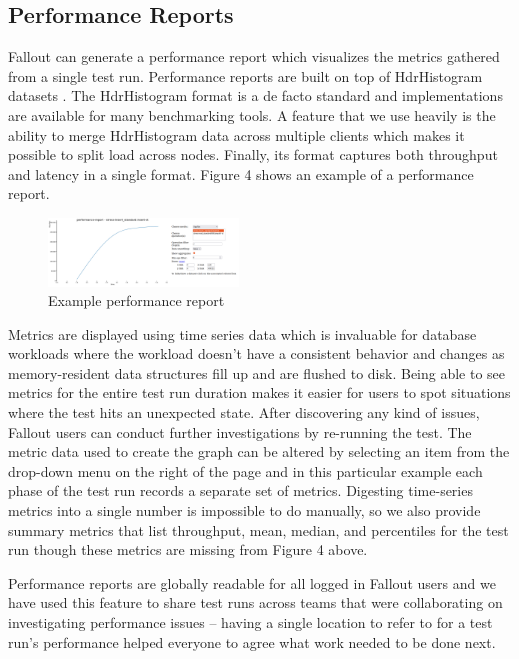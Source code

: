 \documentclass[a4paper,fleqn]{cas-dc}
\begin{document}
\subsection{Performance Reports}

Fallout can generate a performance report which visualizes the metrics gathered from a single test
run. Performance reports are built on top of HdrHistogram datasets \cite{HDRHISTOGRAM}. The HdrHistogram
format is a de facto standard and implementations are available for many benchmarking tools. A
feature that we use heavily is the ability to merge HdrHistogram data across multiple clients which
makes it possible to split load across nodes. Finally, its format captures both throughput and
latency in a single format. Figure 4 shows an example of a performance report.

\begin{figure}
	\includegraphics[width=0.45\textwidth]{perf-report-single}
	\caption{Example performance report}\label{Figure 4}
\end{figure}


Metrics are displayed using time series data which is invaluable for database workloads where the
workload doesn’t have a consistent behavior and changes as memory-resident data structures fill up
and are flushed to disk. Being able to see metrics for the entire test run duration makes it easier
for users to spot situations where the test hits an unexpected state. After discovering any kind of
issues, Fallout users can conduct further investigations by re-running the test. The metric data used
to create the graph can be altered by selecting an item from the drop-down menu on the right of the
page and in this particular example each phase of the test run records a separate set of metrics.
Digesting time-series metrics into a single number is impossible to do manually, so we also provide
summary metrics that list throughput, mean, median, and percentiles for the test run though these
metrics are missing from Figure 4 above.

Performance reports are globally readable for all logged in Fallout users and we have used this
feature to share test runs across teams that were collaborating on investigating performance issues
-- having a single location to refer to for a test run’s performance helped everyone to agree what
work needed to be done next.
\end{document}
